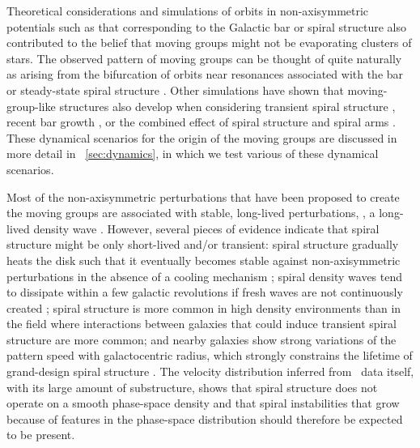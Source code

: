 Theoretical considerations and simulations of orbits in
non-axisymmetric potentials such as that corresponding to the Galactic
bar or spiral structure also contributed to the belief that moving
groups might not be evaporating clusters of stars. The observed
pattern of moving groups can be thought of quite naturally as arising
from the bifurcation of orbits near resonances associated with the bar
\citep{Kalnajs91a,dehnen00a,fux01a} or steady-state spiral structure
\citep{Quillen05a}. Other simulations have shown that
moving-group-like structures also develop when considering transient
spiral structure \citep{deSimone04a}, recent bar growth
\citep{Minchev09a}, or the combined effect of spiral structure and
spiral arms \citep{Quillen03a,Chakrabarty07a,Antoja09a}. These
dynamical scenarios for the origin of the moving groups are discussed
in more detail in \sectionname~\ref{sec:dynamics}, in which we test
various of these dynamical scenarios.

Most of the non-axisymmetric perturbations that have been proposed to
create the moving groups are associated with stable, long-lived
perturbations, \eg, a long-lived density wave \citep{Lin64a}. However,
several pieces of evidence indicate that spiral structure might be
only short-lived and/or transient: spiral structure gradually heats
the disk \citep{Carlberg85a} such that it eventually becomes stable
against non-axisymmetric perturbations in the absence of a cooling
mechanism \citep{Sellwood84a}; spiral density waves tend to dissipate
within a few galactic revolutions if fresh waves are not continuously
created \citep{Toomre69a}; spiral structure is more common in high
density environments than in the field
\citep{Elmegreen82a,Elmegreen83a} where interactions between galaxies
that could induce transient spiral structure are more common; and
nearby galaxies show strong variations of the pattern speed with
galactocentric radius, which strongly constrains the lifetime of
grand-design spiral structure \citep{Merrifield09a,Meidt09a}. The
velocity distribution inferred from \Hipparcos\ data itself, with its
large amount of substructure, shows that spiral structure does not
operate on a smooth phase-space density and that spiral instabilities
that grow because of features in the phase-space distribution
\citep[\eg,][]{Sellwood89a,Sellwood91a} should therefore be expected
to be present.

